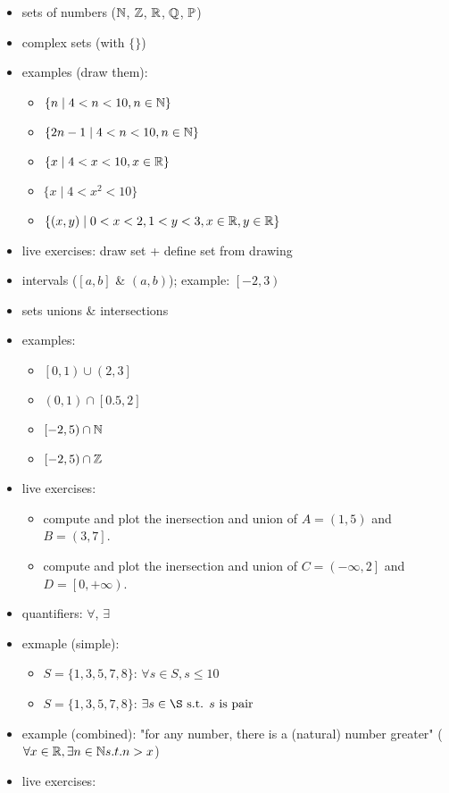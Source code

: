 \begin{itemize}
\tightlist
\item
  sets of numbers (\(\mathbb{N}\), \(\mathbb{Z}\), \(\mathbb{R}\), \(\mathbb{Q}\), \(\mathbb{P}\))
\item
  complex sets (with \(\{ \}\))
\item
  examples (draw them):

  \begin{itemize}
  \tightlist
  \item
    \(\{n \mid 4<n<10, n \in \mathbb{N} \}\)
  \item
    \(\{2n-1 \mid 4<n<10 , n \in \mathbb{N} \}\)
  \item
    \(\{x \mid 4<x<10, x \in \mathbb{R} \}\)
  \item
    \(\{x \mid 4<x^2<10 \}\)
  \item
    \(\{(x,y) \mid 0<x<2 , 1<y<3, x \in \mathbb{R}, y \in \mathbb{R} \}\)
  \end{itemize}
\item
  live exercises: draw set + define set from drawing
\item
  intervals (\(\left[a,b\right]\) \& \(\left(a,b\right)\)); example:
  \(\left[-2, 3\right)\)
\item
  sets unions \& intersections
\item
  examples:

  \begin{itemize}
  \tightlist
  \item
    \(\left[0,1\right) \cup \left(2,3\right]\)
  \item
    \(\left(0,1\right) \cap \left[0.5,2\right]\)
  \item
    \(\left[-2,5\right) \cap \mathbb{N}\)
  \item
    \(\left[-2,5\right) \cap \mathbb{Z}\)
  \end{itemize}
\item
  live exercises:

  \begin{itemize}
  \tightlist
  \item
    compute and plot the inersection and union of
    \(A = \left(1, 5\right)\) and \(B = \left(3, 7\right]\).
  \item
    compute and plot the inersection and union of
    \(C = \left(-\infty, 2\right]\) and
    \(D = \left[0, +\infty \right)\).
  \end{itemize}
\item
  quantifiers: \(\forall\), \(\exists\)
\item
  exmaple (simple):

  \begin{itemize}
  \tightlist
  \item
    \(S = \{1,3,5,7,8\}\): \(\forall s \in S, s \leq 10\)
  \item
    \(S = \{1,3,5,7,8\}\): \(\exists s \in \S \st s \text{ is pair}\)
  \end{itemize}
\item
  example (combined): "for any number, there is a (natural) number
  greater" (\(\forall x \in \mathbb{R}, \exists n \in \mathbb{N} s.t. n>x\))
\item
  live exercises:


\end{itemize}
